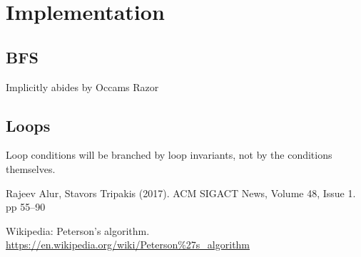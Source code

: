 \documentclass[12pt]{article}
\begin{document}
\section{Implementation}
\subsection{BFS}
Implicitly abides by Occams Razor

\subsection{Loops}
Loop conditions will be branched by loop invariants, not by the conditions themselves.  


\begin{thebibliography}{9}
Rajeev Alur, Stavors Tripakis (2017).  ACM SIGACT News, Volume 48, Issue 1.  pp 55–90

Wikipedia: Peterson's algorithm.  \url{https://en.wikipedia.org/wiki/Peterson\%27s_algorithm}
\end{thebibliography}
\end{document}
